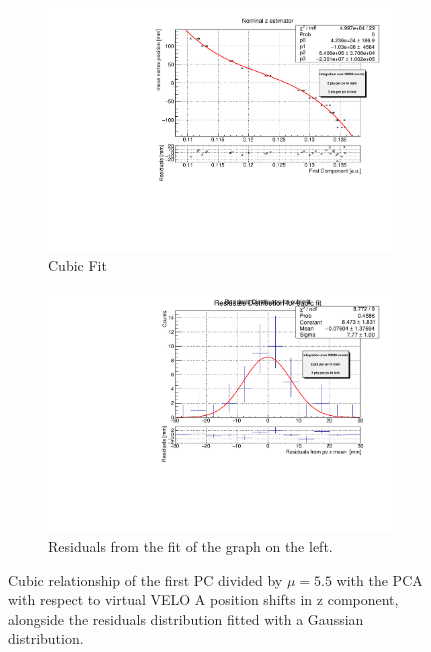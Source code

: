 \begin{figure}
    \centering
    \begin{subfigure}{0.48\textwidth}
    \includegraphics[width=\linewidth]{figures/z_fit_veloA_normalised.pdf}
    \caption{Cubic Fit}\label{fig:z_veloA_fit_MC}
    \end{subfigure}
    \begin{subfigure}{0.48\textwidth}
    \includegraphics[width=\linewidth]{figures/z_res_veloA_normalised.pdf}
    \caption{Residuals from the fit of the graph on the left. }\label{fig:z_veloA_res_MC}
    \end{subfigure}
    \caption{Cubic relationship of the first PC divided by $\mu=5.5$ with the PCA with respect to virtual VELO A position shifts in z component, alongside the residuals distribution fitted with a Gaussian distribution.}
    \label{fig:z_veloA_MC}
\end{figure}

